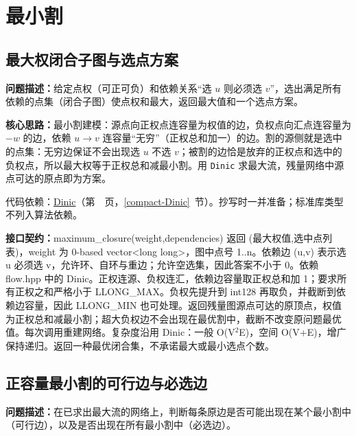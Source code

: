 \Needspace{573pt}

\section{最小割}

\subsection{最大权闭合子图与选点方案}\label{compact-maximum_closure}

\noindent\textbf{问题描述：}\allowbreak 给定点权（可正可负）和依赖关系“选 $u$ 则必须选 $v$”，选出满足所有依赖的点集（闭合子图）使点权和最大，返回最大值和一个选点方案。

\textbf{核心思路：}\allowbreak 最小割建模：源点向正权点连容量为权值的边，负权点向汇点连容量为 $-w$ 的边，依赖 $u\to v$ 连容量“无穷”（正权总和加一）的边。割的源侧就是选中的点集：无穷边保证不会出现选 $u$ 不选 $v$；被割的边恰是放弃的正权点和选中的负权点，所以最大权等于正权总和减最小割。用 \texttt{Dinic} 求最大流，残量网络中源点可达的原点即为方案。

代码依赖：\hyperref[compact-Dinic]{Dinic}（第~\pageref{compact-Dinic}~页，\ref{compact-Dinic}~节）。抄写时一并准备；标准库类型不列入算法依赖。

{\sloppy{}\noindent\textbf{接口契约：}maximum\_closure(weight,dependencies) 返回 (最大权值,选中点列表)，weight 为 0-based vector<long long>，图中点号 1..n。依赖边 (u,v) 表示选 u 必须选 v，允许环、自环与重边；允许空选集，因此答案不小于 0。依赖 flow.hpp 中的 Dinic。正权连源、负权连汇，依赖边容量取正权总和加 1；要求所有正权之和严格小于 LLONG\_MAX。负权先提升到 int128 再取负，并截断到依赖边容量，因此 LLONG\_MIN 也可处理。返回残量图源点可达的原顶点，权值为正权总和减最小割；超大负权边不会出现在最优割中，截断不改变原问题最优值。每次调用重建网络。复杂度沿用 Dinic：一般 O(V$^{2}$E)，空间 O(V+E)，增广保持递归。返回一种最优闭合集，不承诺最大或最小选点个数。\par}



\Needspace{389pt}

\subsection{正容量最小割的可行边与必选边}\label{compact-mincut_edges}

\noindent\textbf{问题描述：}\allowbreak 在已求出最大流的网络上，判断每条原边是否可能出现在某个最小割中（可行边），以及是否出现在所有最小割中（必选边）。

